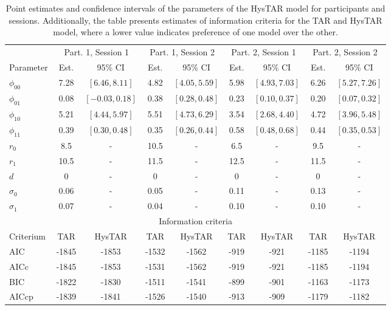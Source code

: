 \documentclass{article}
\begin{document}
\begin{table}[h!]
\begin{center}
\begin{tabular}{ l  c c  c c c c c c }
\hline
 & 
 \multicolumn{2}{c}{Part. 1, Session 1} 
 & \multicolumn{2}{c}{Part. 1, Session 2} 
 & \multicolumn{2}{c}{Part. 2, Session 1} 
 & \multicolumn{2}{c}{Part. 2, Session 2} \\
 \cline{2-9}
Parameter 
& Est. & 95\% CI 
& Est. & 95\% CI 
& Est. & 95\% CI 
& Est. & 95\% CI \\ 
\hline
$\phi_{00}$ 
& 7.28 & $[6.46, 8.11]$ 
& 4.82 & $[4.05, 5.59]$ 
& 5.98 & $[4.93, 7.03]$
& 6.26 & $[5.27, 7.26]$ \\
$\phi_{01}$ 
& 0.08 & $[-0.03, 0.18]$ 
& 0.38 & $[0.28, 0.48]$
& 0.23 & $[0.10, 0.37]$
& 0.20 & $[0.07, 0.32]$ \\
$\phi_{10}$ 
& 5.21 & $[4.44, 5.97]$ 
& 5.51 & $[4.73, 6.29]$
& 3.54 & $[2.68, 4.40]$
& 4.72 & $[3.96, 5.48]$ \\
$\phi_{11}$ 
& 0.39 & $[0.30, 0.48]$ 
& 0.35 & $[0.26, 0.44]$
& 0.58 & $[0.48, 0.68]$
& 0.44 & $[0.35, 0.53]$ \\
$r_0$ 
& 8.5 & - 
& 10.5 & -  
& 6.5 & -  
& 9.5 & - \\
$r_1$ 
& 10.5 & - 
& 11.5 & -
& 12.5 & -
& 11.5 & - \\
$d$ 
& 0 & - 
& 0 & -
& 0 & -
& 0 & -\\
$\sigma_0$ 
& 0.06 & - 
& 0.05 & -
& 0.11 & -
& 0.13 & - \\
$\sigma_1$ 
& 0.07 & - 
& 0.04 & - 
& 0.10 & - 
& 0.10 & - \\
\multicolumn{9}{c}{Information criteria} \\
\hline
Criterium 	& TAR 	& HysTAR 	& TAR 	& HysTAR 	& TAR 	& HysTAR 	& TAR 	& HysTAR \\
\hline
AIC 			& -1845 	& -1853 		& -1532 	& -1562 	 	& -919	& -921		& -1185	& -1194  \\
AICc 		& -1845 	& -1853 		& -1531 	& -1562 		& -919	& -921		& -1185	& -1194  \\
BIC 			& -1822 	& -1830 		& -1511	& -1541		& -899	& -901		& -1163 & -1173  \\
AICcp 		& -1839 	& -1841 		& -1526 	& -1540 	 	& -913	& -909		& -1179	& -1182  \\
\hline
\end{tabular}
\caption{Point estimates and confidence intervals of the parameters of the HysTAR model for participants and sessions. Additionally, the table presents estimates of information criteria for the TAR and HysTAR model, where a lower value indicates preference of one model over the other.}
\end{center}
\end{table}
\end{document}
